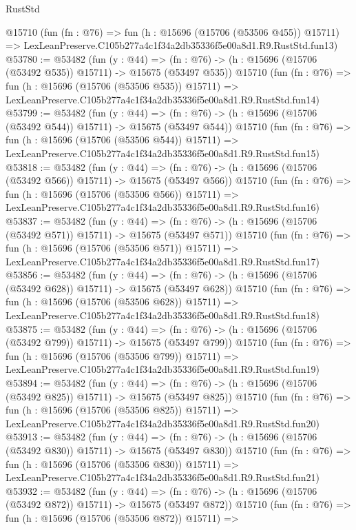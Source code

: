\begin{lexlean}{RustStd}
\begin{coremodule}
    @15710
    (fun (fn : @76) =>
    fun (h : @15696 (@15706 (@53506 @455)) @15711) =>
    LexLeanPreserve.C105b277a4c1f34a2db35336f5e00a8d1.R9.RustStd.fun13)
@53780 := @53482
    (fun (y : @44) =>
    (fn : @76) -> (h : @15696 (@15706 (@53492 @535)) @15711) -> @15675 (@53497 @535))
    @15710
    (fun (fn : @76) =>
    fun (h : @15696 (@15706 (@53506 @535)) @15711) =>
    LexLeanPreserve.C105b277a4c1f34a2db35336f5e00a8d1.R9.RustStd.fun14)
@53799 := @53482
    (fun (y : @44) =>
    (fn : @76) -> (h : @15696 (@15706 (@53492 @544)) @15711) -> @15675 (@53497 @544))
    @15710
    (fun (fn : @76) =>
    fun (h : @15696 (@15706 (@53506 @544)) @15711) =>
    LexLeanPreserve.C105b277a4c1f34a2db35336f5e00a8d1.R9.RustStd.fun15)
@53818 := @53482
    (fun (y : @44) =>
    (fn : @76) -> (h : @15696 (@15706 (@53492 @566)) @15711) -> @15675 (@53497 @566))
    @15710
    (fun (fn : @76) =>
    fun (h : @15696 (@15706 (@53506 @566)) @15711) =>
    LexLeanPreserve.C105b277a4c1f34a2db35336f5e00a8d1.R9.RustStd.fun16)
@53837 := @53482
    (fun (y : @44) =>
    (fn : @76) -> (h : @15696 (@15706 (@53492 @571)) @15711) -> @15675 (@53497 @571))
    @15710
    (fun (fn : @76) =>
    fun (h : @15696 (@15706 (@53506 @571)) @15711) =>
    LexLeanPreserve.C105b277a4c1f34a2db35336f5e00a8d1.R9.RustStd.fun17)
@53856 := @53482
    (fun (y : @44) =>
    (fn : @76) -> (h : @15696 (@15706 (@53492 @628)) @15711) -> @15675 (@53497 @628))
    @15710
    (fun (fn : @76) =>
    fun (h : @15696 (@15706 (@53506 @628)) @15711) =>
    LexLeanPreserve.C105b277a4c1f34a2db35336f5e00a8d1.R9.RustStd.fun18)
@53875 := @53482
    (fun (y : @44) =>
    (fn : @76) -> (h : @15696 (@15706 (@53492 @799)) @15711) -> @15675 (@53497 @799))
    @15710
    (fun (fn : @76) =>
    fun (h : @15696 (@15706 (@53506 @799)) @15711) =>
    LexLeanPreserve.C105b277a4c1f34a2db35336f5e00a8d1.R9.RustStd.fun19)
@53894 := @53482
    (fun (y : @44) =>
    (fn : @76) -> (h : @15696 (@15706 (@53492 @825)) @15711) -> @15675 (@53497 @825))
    @15710
    (fun (fn : @76) =>
    fun (h : @15696 (@15706 (@53506 @825)) @15711) =>
    LexLeanPreserve.C105b277a4c1f34a2db35336f5e00a8d1.R9.RustStd.fun20)
@53913 := @53482
    (fun (y : @44) =>
    (fn : @76) -> (h : @15696 (@15706 (@53492 @830)) @15711) -> @15675 (@53497 @830))
    @15710
    (fun (fn : @76) =>
    fun (h : @15696 (@15706 (@53506 @830)) @15711) =>
    LexLeanPreserve.C105b277a4c1f34a2db35336f5e00a8d1.R9.RustStd.fun21)
@53932 := @53482
    (fun (y : @44) =>
    (fn : @76) -> (h : @15696 (@15706 (@53492 @872)) @15711) -> @15675 (@53497 @872))
    @15710
    (fun (fn : @76) =>
    fun (h : @15696 (@15706 (@53506 @872)) @15711) =>

\end{coremodule}
\end{lexlean}
